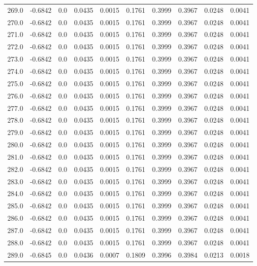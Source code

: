 \begin{longtable}{lrrrrrrrrr}
269.0 & -0.6842 & 0.0 & 0.0435 & 0.0015 & 0.1761 & 0.3999 & 0.3967 & 0.0248 & 0.0041 \\
270.0 & -0.6842 & 0.0 & 0.0435 & 0.0015 & 0.1761 & 0.3999 & 0.3967 & 0.0248 & 0.0041 \\
271.0 & -0.6842 & 0.0 & 0.0435 & 0.0015 & 0.1761 & 0.3999 & 0.3967 & 0.0248 & 0.0041 \\
272.0 & -0.6842 & 0.0 & 0.0435 & 0.0015 & 0.1761 & 0.3999 & 0.3967 & 0.0248 & 0.0041 \\
273.0 & -0.6842 & 0.0 & 0.0435 & 0.0015 & 0.1761 & 0.3999 & 0.3967 & 0.0248 & 0.0041 \\
274.0 & -0.6842 & 0.0 & 0.0435 & 0.0015 & 0.1761 & 0.3999 & 0.3967 & 0.0248 & 0.0041 \\
275.0 & -0.6842 & 0.0 & 0.0435 & 0.0015 & 0.1761 & 0.3999 & 0.3967 & 0.0248 & 0.0041 \\
276.0 & -0.6842 & 0.0 & 0.0435 & 0.0015 & 0.1761 & 0.3999 & 0.3967 & 0.0248 & 0.0041 \\
277.0 & -0.6842 & 0.0 & 0.0435 & 0.0015 & 0.1761 & 0.3999 & 0.3967 & 0.0248 & 0.0041 \\
278.0 & -0.6842 & 0.0 & 0.0435 & 0.0015 & 0.1761 & 0.3999 & 0.3967 & 0.0248 & 0.0041 \\
279.0 & -0.6842 & 0.0 & 0.0435 & 0.0015 & 0.1761 & 0.3999 & 0.3967 & 0.0248 & 0.0041 \\
280.0 & -0.6842 & 0.0 & 0.0435 & 0.0015 & 0.1761 & 0.3999 & 0.3967 & 0.0248 & 0.0041 \\
281.0 & -0.6842 & 0.0 & 0.0435 & 0.0015 & 0.1761 & 0.3999 & 0.3967 & 0.0248 & 0.0041 \\
282.0 & -0.6842 & 0.0 & 0.0435 & 0.0015 & 0.1761 & 0.3999 & 0.3967 & 0.0248 & 0.0041 \\
283.0 & -0.6842 & 0.0 & 0.0435 & 0.0015 & 0.1761 & 0.3999 & 0.3967 & 0.0248 & 0.0041 \\
284.0 & -0.6842 & 0.0 & 0.0435 & 0.0015 & 0.1761 & 0.3999 & 0.3967 & 0.0248 & 0.0041 \\
285.0 & -0.6842 & 0.0 & 0.0435 & 0.0015 & 0.1761 & 0.3999 & 0.3967 & 0.0248 & 0.0041 \\
286.0 & -0.6842 & 0.0 & 0.0435 & 0.0015 & 0.1761 & 0.3999 & 0.3967 & 0.0248 & 0.0041 \\
287.0 & -0.6842 & 0.0 & 0.0435 & 0.0015 & 0.1761 & 0.3999 & 0.3967 & 0.0248 & 0.0041 \\
288.0 & -0.6842 & 0.0 & 0.0435 & 0.0015 & 0.1761 & 0.3999 & 0.3967 & 0.0248 & 0.0041 \\
289.0 & -0.6845 & 0.0 & 0.0436 & 0.0007 & 0.1809 & 0.3996 & 0.3984 & 0.0213 & 0.0018 \\

\end{longtable}
